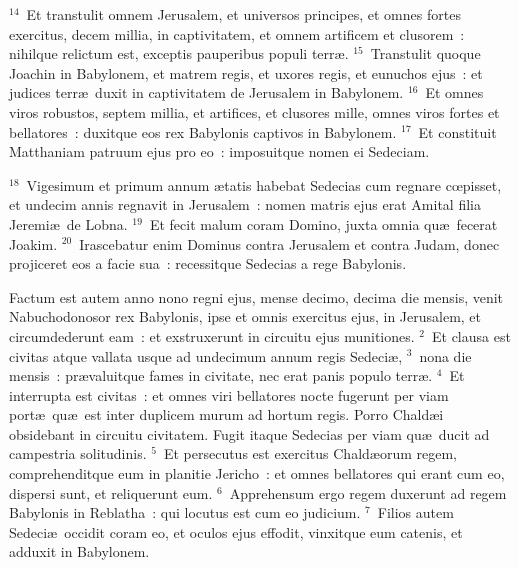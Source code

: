 ${}^{14}$~Et transtulit omnem Jerusalem, et universos principes, et omnes fortes exercitus, decem millia, in captivitatem, et omnem artificem et clusorem~: nihilque relictum est, exceptis pauperibus populi terr\ae .
${}^{15}$~Transtulit quoque Joachin in Babylonem, et matrem regis, et uxores regis, et eunuchos ejus~: et judices terr\ae\ duxit in captivitatem de Jerusalem in Babylonem.
${}^{16}$~Et omnes viros robustos, septem millia, et artifices, et clusores mille, omnes viros fortes et bellatores~: duxitque eos rex Babylonis captivos in Babylonem.
${}^{17}$~Et constituit Matthaniam patruum ejus pro eo~: imposuitque nomen ei Sedeciam.


${}^{18}$~Vigesimum et primum annum \ae tatis habebat Sedecias cum regnare cœpisset, et undecim annis regnavit in Jerusalem~: nomen matris ejus erat Amital filia Jeremi\ae\ de Lobna.
${}^{19}$~Et fecit malum coram Domino, juxta omnia qu\ae\ fecerat Joakim.
${}^{20}$~Irascebatur enim Dominus contra Jerusalem et contra Judam, donec projiceret eos a facie sua~: recessitque Sedecias a rege Babylonis.

\bchapter
\lettrine[lines=3,image=true,loversize=0.05,lraise=-0.03]{F}{}actum est autem anno nono regni ejus, mense decimo, decima die mensis, venit Nabuchodonosor rex Babylonis, ipse et omnis exercitus ejus, in Jerusalem, et circumdederunt eam~: et exstruxerunt in circuitu ejus munitiones.
${}^{2}$~Et clausa est civitas atque vallata usque ad undecimum annum regis Sedeci\ae ,
${}^{3}$~nona die mensis~: pr\ae valuitque fames in civitate, nec erat panis populo terr\ae .
${}^{4}$~Et interrupta est civitas~: et omnes viri bellatores nocte fugerunt per viam port\ae\ qu\ae\ est inter duplicem murum ad hortum regis. Porro Chald\ae i obsidebant in circuitu civitatem. Fugit itaque Sedecias per viam qu\ae\ ducit ad campestria solitudinis.
${}^{5}$~Et persecutus est exercitus Chald\ae orum regem, comprehenditque eum in planitie Jericho~: et omnes bellatores qui erant cum eo, dispersi sunt, et reliquerunt eum.
${}^{6}$~Apprehensum ergo regem duxerunt ad regem Babylonis in Reblatha~: qui locutus est cum eo judicium.
${}^{7}$~Filios autem Sedeci\ae\ occidit coram eo, et oculos ejus effodit, vinxitque eum catenis, et adduxit in Babylonem.


